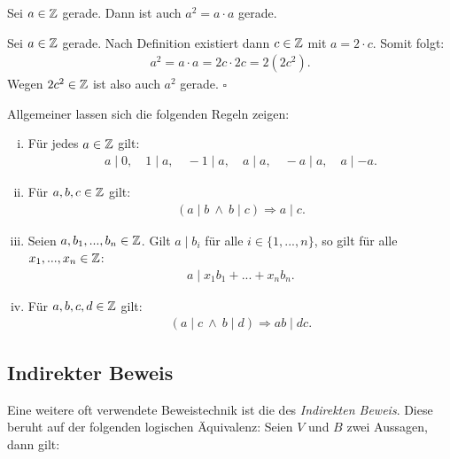 \begin{proposition}
Sei $a \in \mathbb{Z}$ gerade.
Dann ist auch $a^2 = a \cdot a$ gerade.
\end{proposition}

\begin{proof*}
Sei $a \in \mathbb{Z}$ gerade.
Nach Definition existiert dann $c \in \mathbb{Z}$ mit $a = 2 \cdot c$.
Somit folgt:
    \begin{align*}
        a^2 = a \cdot a = 2c \cdot 2c = 2(2c^2).
    \end{align*}
Wegen $2c^2 \in \mathbb{Z}$ ist also auch $a^2$ gerade.
    \hfill $\square$
\end{proof*}

Allgemeiner lassen sich die folgenden Regeln zeigen:

\begin{theorem}
    \begin{enumerate}[(i)]
        \item
        Für jedes $a \in \mathbb{Z}$ gilt:
        \begin{align*}
            a \mid 0, \quad 1 \mid a, \quad -1 \mid a,  \quad a \mid a, \quad -a \mid a, \quad a \mid -a .
        \end{align*}
        \item
        Für $a,b,c \in \mathbb{Z}$ gilt:
        \begin{align*}
            (a \mid b \ \wedge \ b \mid c) \Rightarrow a \mid c .
        \end{align*}
        \item
        Seien $a,b_1,...,b_n \in \mathbb{Z}$. Gilt $a \mid b_i$ für alle $i \in \{1,...,n\}$, so gilt für alle $x_1,...,x_n \in \mathbb{Z}$:
        \begin{align*}
            a \mid x_1 b_1 + ... + x_n b_n .
        \end{align*}
        \item
        Für $a,b,c,d \in \mathbb{Z}$ gilt:
        \begin{align*}
            (a \mid c \ \wedge  \ b \mid d) \Rightarrow ab \mid dc .
        \end{align*}
    \end{enumerate}
\end{theorem}

\begin{proof*}
\end{proof*}

\subsection{Indirekter Beweis}
Eine weitere oft verwendete Beweistechnik ist die des \textit{Indirekten Beweis}.
Diese beruht auf der folgenden logischen Äquivalenz:
Seien $V$ und $B$ zwei Aussagen, dann gilt:

